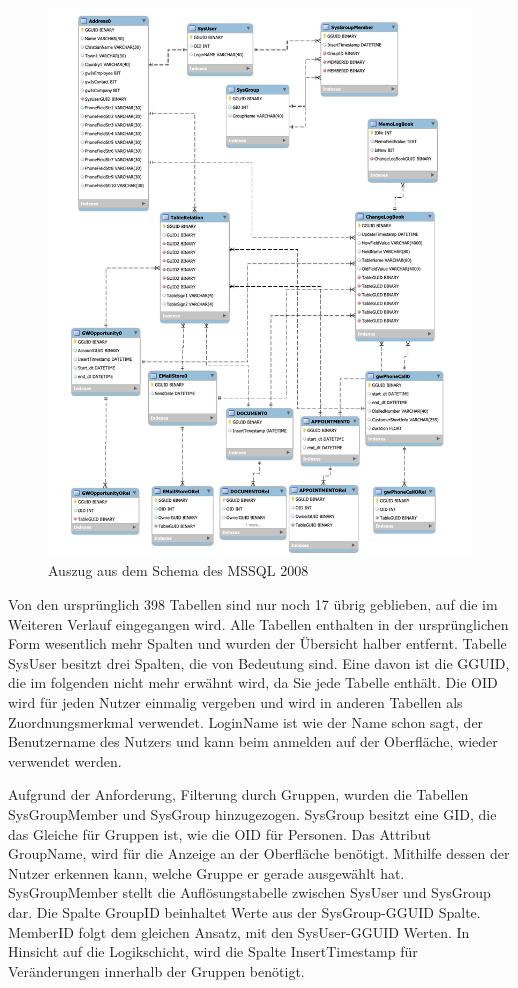 \begin{figure}[H]
	\centering
  \includegraphics[width=1.0\textwidth]{pics/schema_alt.pdf}
	\caption{Auszug aus dem Schema des MSSQL 2008}
	\label{gw_schema_alt}
\end{figure}

Von den ursprünglich 398 Tabellen sind nur noch 17 übrig geblieben, auf die im Weiteren Verlauf eingegangen wird. Alle Tabellen enthalten in der ursprünglichen Form wesentlich mehr Spalten und wurden der Übersicht halber entfernt. Tabelle SysUser besitzt drei Spalten, die von Bedeutung sind. Eine davon ist die GGUID, die im folgenden nicht mehr erwähnt wird, da Sie jede Tabelle enthält. Die OID wird für jeden Nutzer einmalig vergeben und wird in anderen Tabellen als Zuordnungsmerkmal verwendet. LoginName ist wie der Name schon sagt, der Benutzername des Nutzers und kann beim anmelden auf der Oberfläche, wieder verwendet werden. 

Aufgrund der Anforderung, Filterung durch Gruppen, wurden die Tabellen SysGroupMember und SysGroup hinzugezogen. SysGroup besitzt eine GID, die das Gleiche für Gruppen ist, wie die OID für Personen. Das Attribut GroupName, wird für die Anzeige an der Oberfläche benötigt. Mithilfe dessen der Nutzer erkennen kann, welche Gruppe er gerade ausgewählt hat. SysGroupMember stellt die Auflösungstabelle zwischen SysUser und SysGroup dar. Die Spalte GroupID beinhaltet Werte aus der SysGroup-GGUID Spalte. MemberID folgt dem gleichen Ansatz, mit den SysUser-GGUID Werten. In Hinsicht auf die Logikschicht, wird die Spalte InsertTimestamp für Veränderungen innerhalb der Gruppen benötigt.

